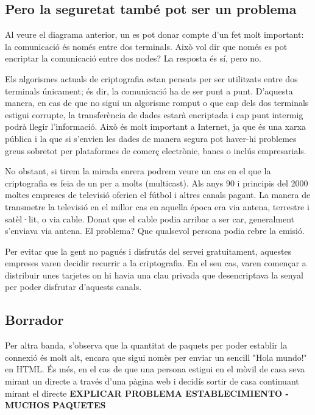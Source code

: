 \subsection{Pero la seguretat també pot ser un problema}
{
    Al veure el diagrama anterior, un es pot donar compte d'un fet molt important: la comunicació és només entre dos terminals. Això vol dir que només es pot
    encriptar la comunicació entre dos nodes? La resposta és sí, pero no.

    Els algorismes actuals de criptografia estan pensats per ser utilitzats entre dos terminals únicament; és dir, la comunicació ha de ser punt a punt. D'aquesta
    manera, en cas de que no sigui un algorisme romput o que cap dels dos terminals estigui corrupte, la transferència de dades estarà encriptada i cap punt
    intermig podrà llegir l'informació. Això és molt important a Internet, ja que és una xarxa pública i la que si s'envien les dades de manera segura pot haver-hi 
    problemes greus sobretot per plataformes de comerç electrònic, bancs o inclús empresarials.

    No obstant, si tirem la mirada enrera podrem veure un cas en el que la criptografia es feia de un per a molts (multicast). Als anys 90 i principis del 2000 moltes
    empreses de televisió oferien el fútbol i altres canals pagant. La manera de transmetre la televisió en el millor cas en aquella época era via antena, terrestre i
    satèl·lit, o via cable. Donat que el cable podia arribar a ser car, generalment s'enviava via antena. El problema? Que qualsevol persona podia rebre la emisió.

    Per evitar que la gent no pagués i disfrutás del servei gratuitament, aquestes empreses varen decidir recurrir a la criptografia. En el seu cas, varen començar
    a distribuir unes tarjetes on hi havia una clau privada que desencriptava la senyal per poder disfrutar d'aquests canals. 
    
}

\subsection{Borrador}
{
    Per altra banda, s'observa que la quantitat de paquets per poder establir la connexió és molt alt, encara que sigui nomès
    per enviar un sencill "Hola mundo!" en HTML. És més, en el cas de que una persona estigui en el mòvil de casa seva mirant un directe a través d'una pàgina web
    i decidís sortir de casa continuant mirant el directe  \textbf{EXPLICAR PROBLEMA ESTABLECIMIENTO - MUCHOS PAQUETES}
}